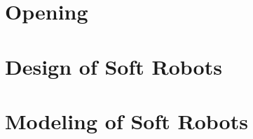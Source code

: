 \documentclass[print,thumbmain]{thesis}  %
\author{Brandon Jonathan Caasenbrood}
\def\printAbstract{1}
\begin{document}

%
\ifx\printAbstract\undefined
\else
 
\fi

%
%

\ifx\printContent\undefined
\else
\cleardoublepage
\ifx\printNomenclature\undefined
\else
{}

\fi
\tableofcontents
\newpage
\fi

\ifx\printParts\undefined
\else
\isstarredchapterfalse
\cleardoublepage
\thispagestyle{empty}
\label{chap: intro}
\setcounter{page}{1}
\fi

\ifx\printParts\undefined
\else
\part{Opening}\label{part: intro}

\fi
\ifx\printParts\undefined
\else
\cleardoublepage
\part{Design of Soft Robots}\label{part: design}

\fi
\ifx\printParts\undefined
\else
\part{Modeling of Soft Robots}\label{part: model}

\end{document}
